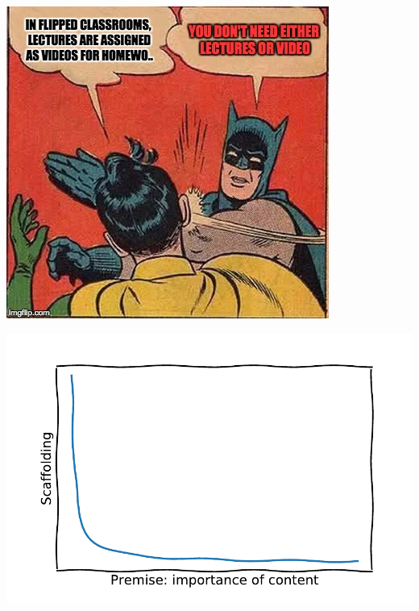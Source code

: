 \documentclass{beamer}
\begin{document}
    \begin{frame}
		\begin{center}
			\includegraphics[width=.6\textwidth]{./static/time_for_this_again.png}
		\end{center}
	\end{frame}

    \begin{frame}
		\begin{center}
            \includegraphics[width=.8\textwidth]{./static/scaffolding_vs_pedagogic_premise.pdf}
		\end{center}
	\end{frame}
\end{document}
